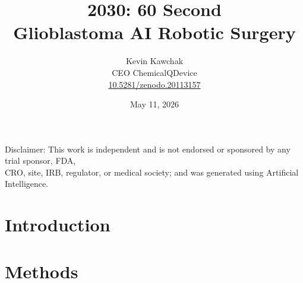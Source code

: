 \documentclass[11pt]{article}
\title{2030: 60 Second\\Glioblastoma AI Robotic Surgery}
\author{
  Kevin Kawchak\hspace{2pt}\orcidicon{0009-0007-5457-8667} \\
  CEO ChemicalQDevice\\
  \href{https://doi.org/10.5281/zenodo.20113157}{10.5281/zenodo.20113157} \\
}
\date{May 11, 2026}
\begin{document}
\maketitle

\begin{abstract}

\end{abstract}

\begin{center}
\normalsize
Disclaimer: This work is independent and is not endorsed or sponsored by any
trial sponsor, FDA,\\CRO, site, IRB, regulator, or medical society; and was
generated using Artificial Intelligence.
\end{center}


\vspace{-0.2cm}

\section{Introduction}
\label{sec:introduction}


\newpage
\tableofcontents

\vspace{0.4cm}

\newpage
\section{Methods}
\label{sec:methods}

\newpage

\end{document}

